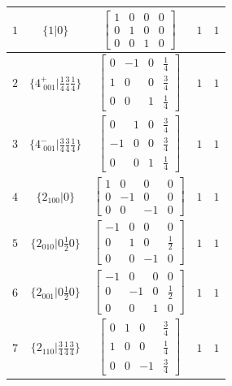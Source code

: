 \documentclass[fleqn,8pt]{jsarticle}
\begin{document}
\begin{longtable}{ccccc}
$ 1 $ & $ \{1|0\} $ & $ \begin{bmatrix} 1 & 0 & 0 & 0 \\ 0 & 1 & 0 & 0 \\ 0 & 0 & 1 & 0 \end{bmatrix} $ & $ 1 $ & $ 1 $ \\ \hline
$ 2 $ & $ \{4^{+}_{\,\,001}|\frac{1}{4} \frac{3}{4} \frac{1}{4}\} $ & $ \begin{bmatrix} 0 & -1 & 0 & \frac{1}{4} \\ 1 & 0 & 0 & \frac{3}{4} \\ 0 & 0 & 1 & \frac{1}{4} \end{bmatrix} $ & $ 1 $ & $ 1 $ \\ \hline
$ 3 $ & $ \{4^{-}_{\,\,001}|\frac{3}{4} \frac{3}{4} \frac{1}{4}\} $ & $ \begin{bmatrix} 0 & 1 & 0 & \frac{3}{4} \\ -1 & 0 & 0 & \frac{3}{4} \\ 0 & 0 & 1 & \frac{1}{4} \end{bmatrix} $ & $ 1 $ & $ 1 $ \\ \hline
$ 4 $ & $ \{2{}_{100}|0\} $ & $ \begin{bmatrix} 1 & 0 & 0 & 0 \\ 0 & -1 & 0 & 0 \\ 0 & 0 & -1 & 0 \end{bmatrix} $ & $ 1 $ & $ 1 $ \\ \hline
$ 5 $ & $ \{2{}_{010}|0 \frac{1}{2} 0\} $ & $ \begin{bmatrix} -1 & 0 & 0 & 0 \\ 0 & 1 & 0 & \frac{1}{2} \\ 0 & 0 & -1 & 0 \end{bmatrix} $ & $ 1 $ & $ 1 $ \\ \hline
$ 6 $ & $ \{2{}_{001}|0 \frac{1}{2} 0\} $ & $ \begin{bmatrix} -1 & 0 & 0 & 0 \\ 0 & -1 & 0 & \frac{1}{2} \\ 0 & 0 & 1 & 0 \end{bmatrix} $ & $ 1 $ & $ 1 $ \\ \hline
$ 7 $ & $ \{2{}_{110}|\frac{3}{4} \frac{1}{4} \frac{3}{4}\} $ & $ \begin{bmatrix} 0 & 1 & 0 & \frac{3}{4} \\ 1 & 0 & 0 & \frac{1}{4} \\ 0 & 0 & -1 & \frac{3}{4} \end{bmatrix} $ & $ 1 $ & $ 1 $ \\ \hline

\end{longtable}
\end{document}
